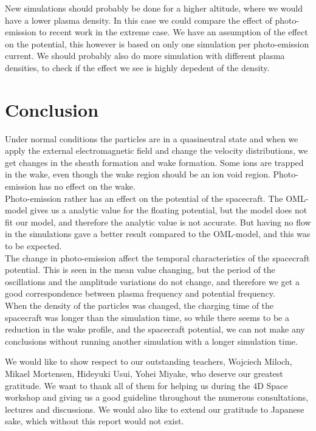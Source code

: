\documentclass[aip, 
rsi, 
amsmath,
amssymb,
longbibliography,
reprint]{revtex4-1}
\begin{document}
New simulations should probably be done for a higher altitude, where we would have a lower plasma density. In this case we could compare the effect of photo-emission to recent work in the extreme case\cite{P8}. We have an assumption of the effect on the potential, this however is based on only one simulation per photo-emission current. We should probably also do more simulation with different plasma densities, to check if the effect we see is highly depedent of the density.

\section{Conclusion}
Under normal conditions the particles are in a quasineutral state and when we apply the external electromagnetic field and change the velocity distributions, we get changes in the sheath formation and wake formation. Some ions are trapped in the wake, even though the wake region should be an ion void region. Photo-emission has no effect on the wake. \\

Photo-emission rather has an effect on the potential of the spacecraft. The OML-model gives us a analytic value for the floating potential, but the model does not fit our model, and therefore the analytic value is not accurate. But having no flow in the simulations gave a better result compared to the OML-model, and this was to be expected. \\

The change in photo-emission affect the temporal characteristics of the spacecraft potential. This is seen in the mean value changing, but the period of the oscillations and the amplitude variations do not change, and therefore we get a good correspondence between plasma frequency and potential frequency. \\

When the density of the particles was changed, the charging time of the spacecraft was longer than the simulation time, so while there seems to be a reduction in the wake profile, and the spacecraft potential, we can not make any conclusions without running another simulation with a longer simulation time.

\begin{acknowledgments}
We would like to show respect to our outstanding teachers, Wojciech Miloch, Mikael Mortensen, Hideyuki Usui, Yohei Miyake, who deserve our greatest gratitude. We want to thank all of them for helping us during the 4D Space workshop and giving us a good guideline throughout the numerous consultations, lectures and discussions. We would also like to extend our gratitude to Japanese sake, which without this report would not exist.
\end{acknowledgments}


\end{document}
